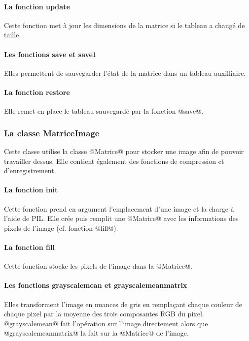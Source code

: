 \documentclass{article}
\begin{document}
\paragraph{La fonction update}

Cette fonction met à jour les dimensions de la matrice si le tableau a changé de taille.

\paragraph{Les fonctions save et save1} 

Elles permettent de sauvegarder l'état de la matrice dans un tableau auxilliaire.

\paragraph{La fonction restore}

Elle remet en place le tableau sauvegardé par la fonction @save@.


\subsubsection{La classe MatriceImage}

Cette classe utilise la classe @Matrice@ pour stocker une image afin de pouvoir travailler dessus. Elle contient également des fonctions de compression et d'enregistrement.

\paragraph{La fonction init}

Cette fonction prend en argument l'emplacement d'une image et la charge à l'aide de PIL. Elle crée puis remplit une @Matrice@ avec les informations des pixels de l'image (cf. fonction @fill@).

\paragraph{La fonction fill}

Cette fonction stocke les pixels de l'image dans la @Matrice@.

\paragraph{Les fonctions grayscalemean et grayscalemeanmatrix}

Elles transforment l'image en nuances de gris en remplaçant chaque couleur de chaque pixel par la moyenne des trois composantes RGB du pixel.
@grayscalemean@ fait l'opération sur l'image directement alors que @grayscalemeanmatrix@ la fait sur la @Matrice@ de l'image.
\end{document}

